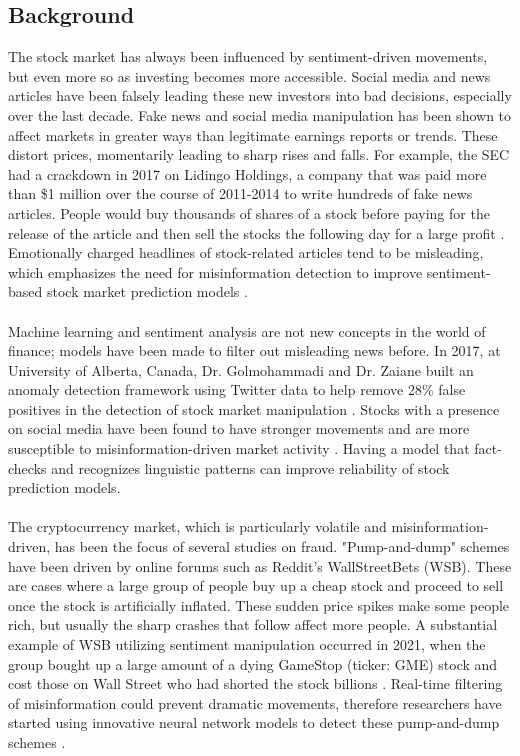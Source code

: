 \documentclass{article}
\begin{document}
\subsection{Background}

The stock market has always been influenced by sentiment-driven movements, but even more so as investing becomes more accessible. Social media and news articles have been falsely leading these new investors into bad decisions, especially over the last decade. Fake news and social media manipulation has been shown to affect markets in greater ways than legitimate earnings reports or trends. These distort prices, momentarily leading to sharp rises and falls. For example, the SEC had a crackdown in 2017 on Lidingo Holdings, a company that was paid more than \$1 million over the course of 2011-2014 to write hundreds of fake news articles. People would buy thousands of shares of a stock before paying for the release of the article and then sell the stocks the following day for a large profit \cite{source1}. Emotionally charged headlines of stock-related articles tend to be misleading, which emphasizes the need for misinformation detection to improve sentiment-based stock market prediction models \cite{source2, source1, source3}. 
\\\\
Machine learning and sentiment analysis are not new concepts in the world of finance; models have been made to filter out misleading news before. In 2017, at University of Alberta, Canada, Dr. Golmohammadi and Dr. Zaiane built an anomaly detection framework using Twitter data to help remove 28\% false positives in the detection of stock market manipulation \cite{source4}. Stocks with a presence on social media have been found to have stronger movements and are more susceptible to misinformation-driven market activity \cite{source5}. Having a model that fact-checks and recognizes linguistic patterns can improve reliability of stock prediction models.
\\\\
The cryptocurrency market, which is particularly volatile and misinformation-driven, has been the focus of several studies on fraud. "Pump-and-dump" schemes have been driven by online forums such as Reddit's WallStreetBets (WSB). These are cases where a large group of people buy up a cheap stock and proceed to sell once the stock is artificially inflated. These sudden price spikes make some people rich, but usually the sharp crashes that follow affect more people. A substantial example of WSB utilizing sentiment manipulation occurred in 2021, when the group bought up a large amount of a dying GameStop (ticker: GME) stock and cost those on Wall Street who had shorted the stock billions \cite{source8, source7}. Real-time filtering of misinformation could prevent dramatic movements, therefore researchers have started using innovative neural network models to detect these pump-and-dump schemes \cite{source6}.
\end{document}
